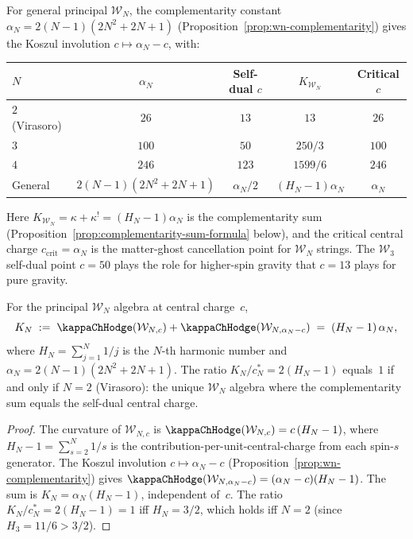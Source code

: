 \begin{remark}
\label{rem:wn-koszul-involution}
%
For general principal $\mathcal{W}_N$, the complementarity constant
$\alpha_N = 2(N{-}1)(2N^2{+}2N{+}1)$
(Proposition~\ref{prop:wn-complementarity}) gives
the Koszul involution $c \mapsto \alpha_N - c$, with:
\begin{center}
\renewcommand{\arraystretch}{1.2}
\begin{tabular}{lcccc}
\toprule
$N$ & $\alpha_N$ & Self-dual $c$ & $K_{\mathcal{W}_N}$ & Critical $c$ \\
\midrule
$2$ (Virasoro) & $26$ & $13$ & $13$ & $26$ \\
$3$ & $100$ & $50$ & $250/3$ & $100$ \\
$4$ & $246$ & $123$ & $1599/6$ & $246$ \\
General & $2(N{-}1)(2N^2{+}2N{+}1)$ & $\alpha_N/2$ & $(H_N{-}1)\alpha_N$ & $\alpha_N$ \\
\bottomrule
\end{tabular}
\end{center}
Here $K_{\mathcal{W}_N} = \kappa + \kappa^! = (H_N - 1)\alpha_N$
is the complementarity sum
(Proposition~\ref{prop:complementarity-sum-formula} below),
and the critical central charge $c_{\mathrm{crit}} = \alpha_N$
is the matter-ghost cancellation point for $\mathcal{W}_N$ strings.
The $\mathcal{W}_3$ self-dual point $c = 50$ plays the role for
higher-spin gravity that $c = 13$ plays for pure gravity.
\end{remark}

\begin{proposition}
\label{prop:complementarity-sum-formula}
For the principal $\mathcal{W}_N$ algebra at central charge~$c$,
\begin{equation}\label{eq:complementarity-sum-formula}
K_N \;:=\; \kappaChHodge(\mathcal{W}_{N,c})
 + \kappaChHodge(\mathcal{W}_{N,\alpha_N - c})
\;=\; (H_N - 1)\,\alpha_N,
\end{equation}
where $H_N = \sum_{j=1}^N 1/j$ is the $N$-th harmonic number
and $\alpha_N = 2(N{-}1)(2N^2{+}2N{+}1)$. The ratio
$K_N/c_N^* = 2(H_N - 1)$ equals~$1$ if and only if $N = 2$
\textup{(}Virasoro\textup{)}: the unique $\mathcal{W}_N$ algebra
where the complementarity sum equals the self-dual central charge.
\end{proposition}

\begin{proof}
The curvature of $\mathcal{W}_{N,c}$ is
$\kappaChHodge(\mathcal{W}_{N,c}) = c\,(H_N - 1)$, where $H_N - 1
= \sum_{s=2}^N 1/s$ is the contribution-per-unit-central-charge
from each spin-$s$ generator. The Koszul involution
$c \mapsto \alpha_N - c$
(Proposition~\ref{prop:wn-complementarity}) gives
$\kappaChHodge(\mathcal{W}_{N,\alpha_N - c}) = (\alpha_N - c)(H_N - 1)$.
The sum is $K_N = \alpha_N(H_N - 1)$, independent of~$c$.
The ratio $K_N/c_N^* = 2(H_N - 1) = 1$ iff $H_N = 3/2$, which
holds iff $N = 2$ (since $H_3 = 11/6 > 3/2$).
\end{proof}

